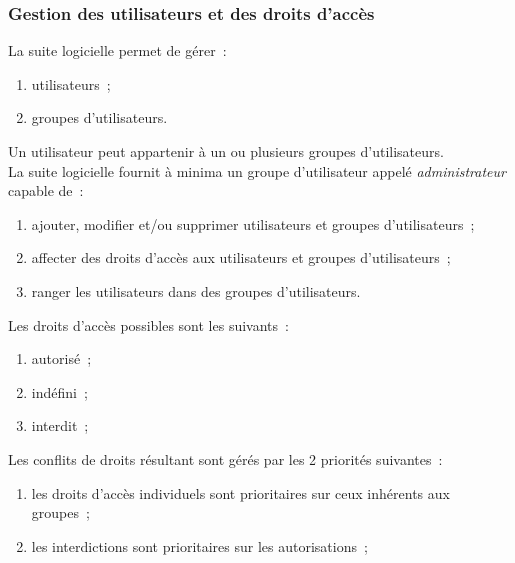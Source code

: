 \subsubsection{Gestion des utilisateurs et des droits d'accès}
La suite logicielle permet de gérer~:
\begin{enumerate}
	\item utilisateurs~;
	\item groupes d'utilisateurs.
\end{enumerate}
Un utilisateur peut appartenir à un ou plusieurs groupes d'utilisateurs.
\\
La suite logicielle fournit à minima un groupe d'utilisateur appelé \emph{administrateur} capable de~:
\begin{enumerate}
	\item ajouter, modifier et/ou supprimer utilisateurs et groupes d'utilisateurs~;
	\item affecter des droits d'accès aux utilisateurs et groupes d'utilisateurs~;
	\item ranger les utilisateurs dans des groupes d'utilisateurs.
\end{enumerate}
Les droits d'accès possibles sont les suivants~:
\begin{enumerate}
	\item autorisé~;
	\item indéfini~;
	\item interdit~;
\end{enumerate}
Les conflits de droits résultant sont gérés par les 2 priorités suivantes~:
\begin{enumerate}
	\item les droits d'accès individuels sont prioritaires sur ceux inhérents aux groupes~;
	\item les interdictions sont prioritaires sur les autorisations~;
\end{enumerate}

